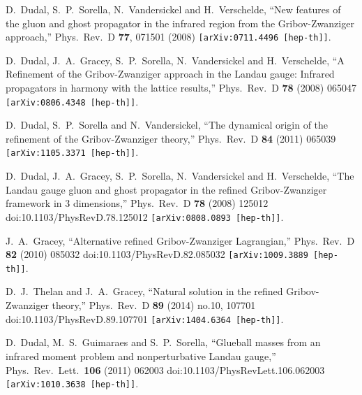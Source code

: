 \documentclass[a4paper,11pt,british,twosides]{book}%
\numberwithin{equation}{section}
\begin{document}
\begin{thebibliography}{9}
  D.~Dudal, S.~P.~Sorella, N.~Vandersickel and H.~Verschelde,
  ``New features of the gluon and ghost propagator in the infrared region from the
  Gribov-Zwanziger approach,''
  Phys.\ Rev.\ D {\bf 77}, 071501 (2008)
  {\tt [arXiv:0711.4496 [hep-th]]}.

  D.~Dudal, J.~A.~Gracey, S.~P.~Sorella, N.~Vandersickel and H.~Verschelde,
  ``A Refinement of the Gribov-Zwanziger approach in the Landau gauge: Infrared propagators in
  harmony with the lattice results,''
  Phys.\ Rev.\ D {\bf 78} (2008) 065047
  {\tt [arXiv:0806.4348 [hep-th]]}.

  D.~Dudal, S.~P.~Sorella and N.~Vandersickel,
  ``The dynamical origin of the refinement of the Gribov-Zwanziger theory,''
  Phys.\ Rev.\ D {\bf 84} (2011) 065039
  {\tt [arXiv:1105.3371 [hep-th]]}.

  D.~Dudal, J.~A.~Gracey, S.~P.~Sorella, N.~Vandersickel and H.~Verschelde,
  ``The Landau gauge gluon and ghost propagator in the refined Gribov-Zwanziger framework in 3
  dimensions,''
  Phys.\ Rev.\ D {\bf 78} (2008) 125012
  doi:10.1103/PhysRevD.78.125012
  {\tt [arXiv:0808.0893 [hep-th]]}.

  J.~A.~Gracey,
  ``Alternative refined Gribov-Zwanziger Lagrangian,''
  Phys.\ Rev.\ D {\bf 82} (2010) 085032
  doi:10.1103/PhysRevD.82.085032
  {\tt [arXiv:1009.3889 [hep-th]]}.

  D.~J.~Thelan and J.~A.~Gracey,
  ``Natural solution in the refined Gribov-Zwanziger theory,''
  Phys.\ Rev.\ D {\bf 89} (2014) no.10,  107701
  doi:10.1103/PhysRevD.89.107701
  {\tt [arXiv:1404.6364 [hep-th]]}.

  D.~Dudal, M.~S.~Guimaraes and S.~P.~Sorella,
  ``Glueball masses from an infrared moment problem and nonperturbative Landau gauge,''
  Phys.\ Rev.\ Lett.\  {\bf 106} (2011) 062003
  doi:10.1103/PhysRevLett.106.062003
  {\tt [arXiv:1010.3638 [hep-th]]}.
  


\end{thebibliography}
\end{document}
